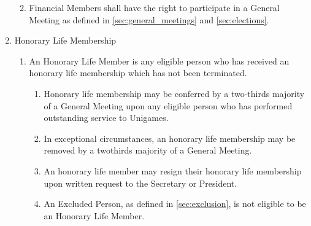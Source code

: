 \documentclass[a4paper]{article}
\begin{document}
\begin{enumerate}
\begin{enumerate}
\begin{enumerate}
              \end{enumerate}
              \item Financial Members shall have the right to participate in a General Meeting as defined in \cref{sec:general_meetings} and \cref{sec:elections}.
          \end{enumerate}
    \item Honorary Life Membership
        \begin{enumerate}
              \item An Honorary Life Member is any eligible person who has received an honorary life membership which has not been terminated.
              \begin{enumerate}
                  \item Honorary life membership may be conferred by a two-thirds majority of a General Meeting upon any eligible person who has performed outstanding service to Unigames.
                  \item In exceptional circumstances, an honorary life membership may be removed by a twothirds majority of a General Meeting.
                  \item An honorary life member may resign their honorary life membership upon written request to the Secretary or President.
                  \item An Excluded Person, as defined in \cref{sec:exclusion}, is not eligible to be an Honorary Life Member.
              \end{enumerate}
          \end{enumerate}
\end{enumerate}
\end{document}
